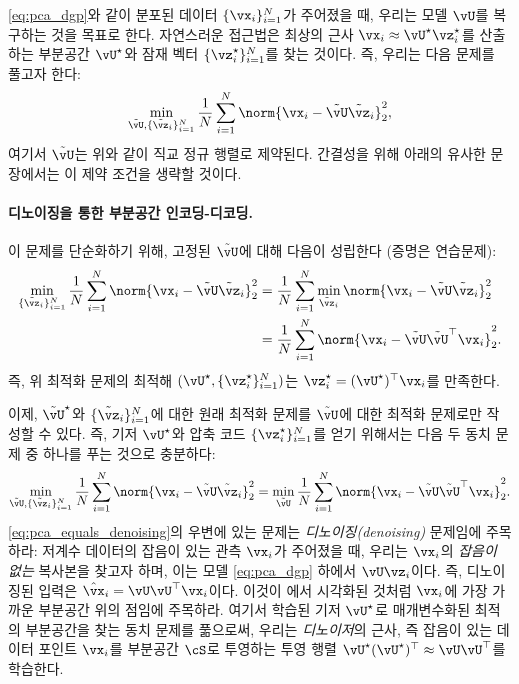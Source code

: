 \documentclass[../../book-main_ko.tex]{subfiles}
\begin{document}
\eqref{eq:pca_dgp}와 같이 분포된 데이터 \(\{\vx_{i}\}_{i = 1}^{N}\)가 주어졌을 때, 우리는 모델 \(\vU\)를 복구하는 것을 목표로 한다. 자연스러운 접근법은 최상의 근사 \(\vx_{i} \approx \vU^{\star}\vz_{i}^{\star}\)를 산출하는 부분공간 \(\vU^{\star}\)와 잠재 벡터 \(\{\vz_{i}^{\star}\}_{i = 1}^{N}\)를 찾는 것이다. 즉, 우리는 다음 문제를 풀고자 한다:
\begin{equation}\label{eq:pca_sparse_recovery_problem}
    \min_{\tilde{\vU}, \{\tilde{\vz}_{i}\}_{i = 1}^{N}}\frac{1}{N}\sum_{i = 1}^{N}\norm{\vx_{i} - \tilde{\vU}\tilde{\vz}_{i}}_{2}^{2},
\end{equation}
여기서 $\tilde{\vU}$는 위와 같이 직교 정규 행렬로 제약된다. 간결성을 위해 아래의 유사한 문장에서는 이 제약 조건을 생략할 것이다.

\paragraph{디노이징을 통한 부분공간 인코딩-디코딩.}
이 문제를 단순화하기 위해, 고정된 \(\tilde{\vU}\)에 대해 다음이 성립한다 (증명은 연습문제):
\begin{align}
    \min_{\{\tilde{\vz}_{i}\}_{i = 1}^{N}}\frac{1}{N}\sum_{i = 1}^{N}\norm{\vx_{i} - \tilde{\vU}\tilde{\vz}_{i}}_{2}^{2}
    &= \frac{1}{N}\sum_{i = 1}^{N}\min_{\tilde{\vz}_{i}}\norm{\vx_{i} - \tilde{\vU}\tilde{\vz}_{i}}_{2}^{2} \\
    &= \frac{1}{N}\sum_{i = 1}^{N}\norm{\vx_{i} - \tilde{\vU}\tilde{\vU}^{\top}\vx_{i}}_{2}^{2}.
\end{align}
즉, 위 최적화 문제의 최적해 \((\vU^{\star}, \{\vz_{i}^{\star}\}_{i = 1}^{N})\)는 $\vz_i^{\star} = (\vU^{\star})^\top\vx_i$를 만족한다.

이제, \(\tilde{\vU}^{\star}\)와 \(\{\tilde{\vz}_{i}\}_{i = 1}^{N}\)에 대한 원래 최적화 문제를 \(\tilde{\vU}\)에 대한 최적화 문제로만 작성할 수 있다. 즉, 기저 \(\vU^{\star}\)와 압축 코드 \(\{\vz_{i}^{\star}\}_{i = 1}^{N}\)를 얻기 위해서는 다음 두 동치 문제 중 하나를 푸는 것으로 충분하다:
\begin{equation}\label{eq:pca_equals_denoising}
    \min_{\tilde{\vU}, \{\tilde{\vz}_{i}\}_{i = 1}^{N}}\frac{1}{N}\sum_{i = 1}^{N}\norm{\vx_{i} - \tilde{\vU}\tilde{\vz}_{i}}_{2}^{2} = \min_{\tilde{\vU}}\frac{1}{N}\sum_{i = 1}^{N}\norm{\vx_{i} - \tilde{\vU}\tilde{\vU}^{\top}\vx_{i}}_{2}^{2}.
\end{equation}
\eqref{eq:pca_equals_denoising}의 우변에 있는 문제는 \textit{디노이징(denoising)} 문제임에 주목하라: 저계수 데이터의 잡음이 있는 관측 \(\vx_{i}\)가 주어졌을 때, 우리는 \(\vx_{i}\)의 \textit{잡음이 없는} 복사본을 찾고자 하며, 이는 모델 \eqref{eq:pca_dgp} 하에서 $\vU\vz_{i}$이다. 즉, 디노이징된 입력은 $\hat{\vx}_i = \vU\vU^\top \vx_i$이다. 이것이 에서 시각화된 것처럼 $\vx_i$에 가장 가까운 부분공간 위의 점임에 주목하라. 여기서 학습된 기저 \(\vU^{\star}\)로 매개변수화된 최적의 부분공간을 찾는 동치 문제를 풂으로써, 우리는 \textit{디노이저}의 근사, 즉 잡음이 있는 데이터 포인트 $\vx_i$를 부분공간 \(\cS\)로 투영하는 투영 행렬 \(\vU^{\star}(\vU^{\star})^{\top} \approx \vU\vU^{\top}\)를 학습한다. %
\end{document}
